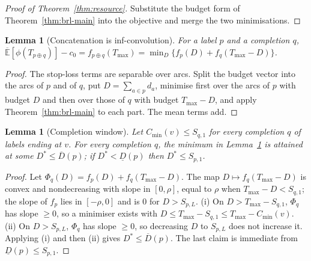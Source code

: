 \documentclass[preprint,11pt]{elsarticle}
\newtheorem{lemma}[theorem]{Lemma}
\theoremstyle{definition}
\theoremstyle{remark}
\newcommand{\Eu}{\overline{\mathbb{E}}}
\newcommand{\Dl}{\underline{D}}
\newcommand{\Dh}{\overline{D}}
\begin{document}
\begin{proof}[Proof of Theorem~\ref{thm:resource}]
Substitute the budget form of Theorem~\ref{thm:brl-main} into the objective and merge the two minimisations.
\end{proof}

\begin{lemma}[Concatenation is inf-convolution]\label{lem:infconv}
For a label $p$ and a completion $q$, $\Eu[\phi(T_{p\oplus q})]-c_0=f_{p\oplus q}(T_{\max})=\min_D\{f_p(D)+f_q(T_{\max}-D)\}$.
\end{lemma}
\begin{proof}
The stop-loss terms are separable over arcs. Split the budget vector into the arcs of $p$ and of $q$, put $D=\sum_{a\in p}d_a$, minimise first over the arcs of $p$ with budget $D$ and then over those of $q$ with budget $T_{\max}-D$, and apply Theorem~\ref{thm:brl-main} to each part. The mean terms add.
\end{proof}

\begin{lemma}[Completion window]\label{lem:window}
Let $C_{\min}(v)\le S_{q,1}$ for every completion $q$ of labels ending at $v$. For every completion $q$, the minimum in Lemma~\ref{lem:infconv} is attained at some $D^*\le\Dh(p)$; if $D^*<\Dl(p)$ then $D^*\le S_{p,1}$.
\end{lemma}
\begin{proof}
Let $\Phi_q(D)=f_p(D)+f_q(T_{\max}-D)$. The map $D\mapsto f_q(T_{\max}-D)$ is convex and nondecreasing with slope in $[0,\rho]$, equal to $\rho$ when $T_{\max}-D<S_{q,1}$; the slope of $f_p$ lies in $[-\rho,0]$ and is $0$ for $D>S_{p,L}$. (i) On $D>T_{\max}-S_{q,1}$, $\Phi_q$ has slope $\ge0$, so a minimiser exists with $D\le T_{\max}-S_{q,1}\le T_{\max}-C_{\min}(v)$. (ii) On $D>S_{p,L}$, $\Phi_q$ has slope $\ge0$, so decreasing $D$ to $S_{p,L}$ does not increase it. Applying (i) and then (ii) gives $D^*\le\Dh(p)$. The last claim is immediate from $\Dl(p)\le S_{p,1}$.
\end{proof}
\end{document}
